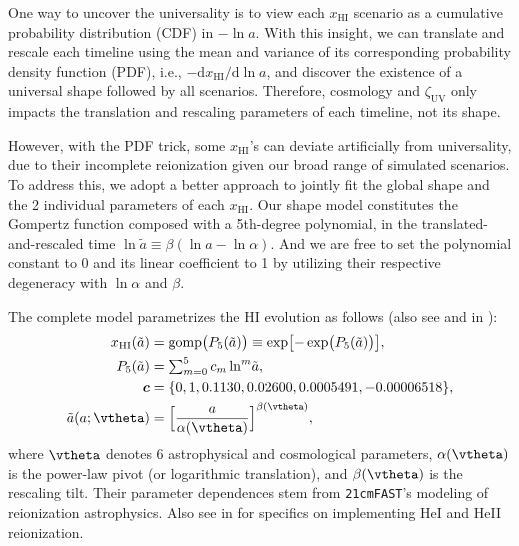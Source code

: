 \documentclass[12pt, a4paper]{article}
\newcommand{\zetaUV}{\zeta_\mathrm{UV}}
\newcommand{\HI}{\mathrm{HI}}
\newcommand{\ap}{\alpha}
\newcommand{\tilt}{\beta}
\newcommand{\ar}{\tilde{a}}
\newcommand{\gomp}{\mathrm{gomp}}
\begin{document}
One way to uncover the universality is to view each $x_\HI$ scenario as
a cumulative probability distribution (CDF) in $- \ln a$.
With this insight, we can translate and rescale each timeline using the
mean and variance of its corresponding probability density function
(PDF), i.e., $- \mathrm{d}x_\HI / \mathrm{d}\ln a$, and discover the
existence of a universal shape followed by all scenarios.
Therefore, cosmology and $\zetaUV$ only impacts the translation and
rescaling parameters of each timeline, not its shape.

However, with the PDF trick, some $x_\HI$'s can deviate artificially
from universality, due to their incomplete reionization given our broad
range of simulated scenarios.
To address this, we adopt a better approach to jointly fit the global
shape and the 2 individual parameters of each $x_\HI$.
Our shape model constitutes the Gompertz function composed with a
5th-degree polynomial, in the translated-and-rescaled time $\ln\ar
\equiv \tilt (\ln a - \ln\ap)$.
And we are free to set the polynomial constant to 0 and its linear
coefficient to 1 by utilizing their respective degeneracy with $\ln\ap$
and $\tilt$.

The complete model parametrizes the HI evolution as follows (also see
 and  in ):
%
\begin{align}
\label{eq:uni}
x_\HI(\ar) &= \gomp\bigl( P_5(\ar) \bigr)
  \equiv \exp\bigl[ - \exp\bigl( P_5(\ar) \bigr) \bigr], \\
%
\label{eq:poly}
P_5(\ar) &= {\textstyle\sum}_{m=0}^5 \, c_m \ln^m\!\ar, \\
%
\bm{c} &= \{0, 1, 0.1130, 0.02600, 0.0005491, -0.00006518\}, \nonumber\\
%
\label{eq:map}
\ar(a; \vtheta) &= \Bigl[ \frac{a}{\ap(\vtheta)} \Bigr]^{\tilt(\vtheta)},
\end{align}
%
where $\vtheta$ denotes 6 astrophysical and cosmological parameters,
$\ap(\vtheta)$ is the power-law pivot (or logarithmic translation), and
$\tilt(\vtheta)$ is the rescaling tilt.
Their parameter dependences stem from \texttt{21cmFAST}'s modeling of
reionization astrophysics.
Also see  in  for specifics on
implementing HeI and HeII reionization.
\end{document}

